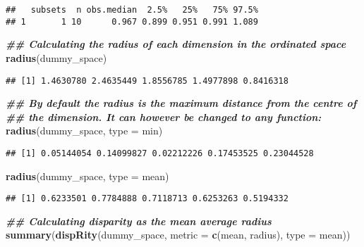\documentclass[
]{book}
\newenvironment{Shaded}{\begin{snugshade}}{\end{snugshade}}
\newcommand{\AttributeTok}[1]{\textcolor[rgb]{0.13,0.29,0.53}{#1}}
\newcommand{\DocumentationTok}[1]{\textcolor[rgb]{0.56,0.35,0.01}{\textbf{\textit{#1}}}}
\newcommand{\FunctionTok}[1]{\textcolor[rgb]{0.13,0.29,0.53}{\textbf{#1}}}
\newcommand{\NormalTok}[1]{#1}
\begin{document}
\begin{verbatim}
##   subsets  n obs.median  2.5%   25%   75% 97.5%
## 1       1 10      0.967 0.899 0.951 0.991 1.089
\end{verbatim}

\begin{Shaded}
\begin{Highlighting}[]
\DocumentationTok{\#\# Calculating the radius of each dimension in the ordinated space}
\FunctionTok{radius}\NormalTok{(dummy\_space)}
\end{Highlighting}
\end{Shaded}

\begin{verbatim}
## [1] 1.4630780 2.4635449 1.8556785 1.4977898 0.8416318
\end{verbatim}

\begin{Shaded}
\begin{Highlighting}[]
\DocumentationTok{\#\# By default the radius is the maximum distance from the centre of}
\DocumentationTok{\#\# the dimension. It can however be changed to any function:}
\FunctionTok{radius}\NormalTok{(dummy\_space, }\AttributeTok{type =}\NormalTok{ min)}
\end{Highlighting}
\end{Shaded}

\begin{verbatim}
## [1] 0.05144054 0.14099827 0.02212226 0.17453525 0.23044528
\end{verbatim}

\begin{Shaded}
\begin{Highlighting}[]
\FunctionTok{radius}\NormalTok{(dummy\_space, }\AttributeTok{type =}\NormalTok{ mean)}
\end{Highlighting}
\end{Shaded}

\begin{verbatim}
## [1] 0.6233501 0.7784888 0.7118713 0.6253263 0.5194332
\end{verbatim}

\begin{Shaded}
\begin{Highlighting}[]
\DocumentationTok{\#\# Calculating disparity as the mean average radius}
\FunctionTok{summary}\NormalTok{(}\FunctionTok{dispRity}\NormalTok{(dummy\_space,}
                 \AttributeTok{metric =} \FunctionTok{c}\NormalTok{(mean, radius),}
                 \AttributeTok{type =}\NormalTok{ mean))}
\end{Highlighting}
\end{Shaded}
\end{document}
